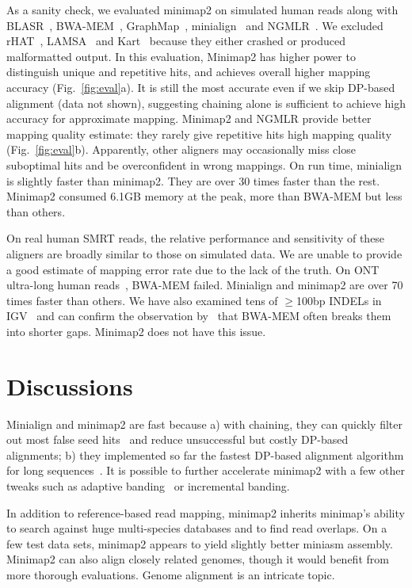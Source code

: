\documentclass{bioinfo}
\begin{document}
As a sanity check, we evaluated minimap2 on simulated human reads along with
BLASR~\citep{Chaisson:2012aa}, 
BWA-MEM~\citep{Li:2013aa},
GraphMap~\citep{Sovic:2016aa},
minialign~\citep{Suzuki:2016} and
NGMLR~\citep{Sedlazeck169557}. We excluded rHAT~\citep{Liu:2016ab},
LAMSA~\citep{Liu:2017aa} and Kart~\citep{Lin:2017aa} because they either
crashed or produced malformatted output. In this evaluation, Minimap2 has
higher power to distinguish unique and repetitive hits, and achieves overall
higher mapping accuracy (Fig.~\ref{fig:eval}a). It is still the most accurate
even if we skip DP-based alignment (data not shown), suggesting chaining alone
is sufficient to achieve high accuracy for approximate mapping. Minimap2 and
NGMLR provide better mapping quality estimate: they rarely give repetitive hits
high mapping quality (Fig.~\ref{fig:eval}b).  Apparently, other aligners may
occasionally miss close suboptimal hits and be overconfident in wrong mappings.
On run time, minialign is slightly faster than minimap2. They are over 30 times
faster than the rest.  Minimap2 consumed 6.1GB memory at the peak, more than
BWA-MEM but less than others.

On real human SMRT reads, the relative performance and sensitivity of
these aligners are broadly similar to those on simulated data. We are unable to
provide a good estimate of mapping error rate due to the lack of the truth.  On
ONT ultra-long human reads~\citep{Jain128835}, BWA-MEM failed. Minialign and
minimap2 are over 70 times faster than others. We have also examined tens of
$\ge$100bp INDELs in IGV~\citep{Robinson:2011aa} and can confirm the
observation by~\citet{Sedlazeck169557} that BWA-MEM often breaks them into
shorter gaps. Minimap2 does not have this issue.

\section{Discussions}

Minialign and minimap2 are fast because a) with chaining, they can quickly
filter out most false seed hits~\citep{Li:2016aa} and reduce unsuccessful but
costly DP-based alignments; b) they implemented so far the fastest DP-based
alignment algorithm for long sequences~\citep{Suzuki:2016}. It is possible to
further accelerate minimap2 with a few other tweaks such as adaptive
banding~\citep{Suzuki130633} or incremental banding.

In addition to reference-based read mapping, minimap2 inherits minimap's
ability to search against huge multi-species databases and to find read
overlaps. On a few test data sets, minimap2 appears to yield slightly better
miniasm assembly. Minimap2 can also align closely related genomes, though it
would benefit from more thorough evaluations. Genome alignment is an intricate
topic.
\end{document}
